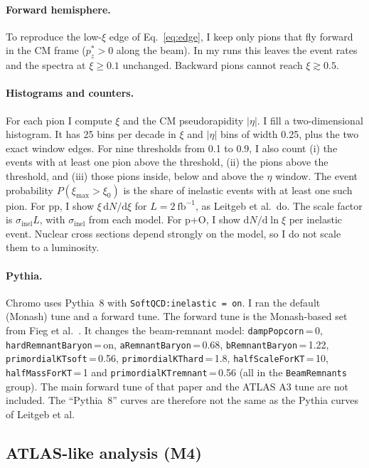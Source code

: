 \documentclass[11pt,a4paper]{article}
\newcommand{\dd}{\mathrm{d}}
\begin{document}
\paragraph{Forward hemisphere.}
To reproduce the low-$\xi$ edge of Eq.~\eqref{eq:edge}, I keep only pions that fly forward in the CM frame ($p_z^{*}>0$ along the beam).
In my runs this leaves the event rates and the spectra at $\xi\geq0.1$ unchanged.
Backward pions cannot reach $\xi\gtrsim0.5$.

\paragraph{Histograms and counters.}
For each pion I compute $\xi$ and the CM pseudorapidity $|\eta|$.
I fill a two-dimensional histogram.
It has 25 bins per decade in $\xi$ and $|\eta|$ bins of width 0.25, plus the two exact window edges.
For nine thresholds from 0.1 to 0.9, I also count
(i) the events with at least one pion above the threshold,
(ii) the pions above the threshold, and
(iii) those pions inside, below and above the $\eta$ window.
The event probability $P(\xi_{\max}>\xi_0)$ is the share of inelastic events with at least one such pion.
For pp, I show $\xi\,\dd N/\dd\xi$ for $L=2~\mathrm{fb^{-1}}$, as Leitgeb et al.\ do.
The scale factor is $\sigma_{\mathrm{inel}}L$, with $\sigma_{\mathrm{inel}}$ from each model.
For p+O, I show $\dd N/\dd\ln\xi$ per inelastic event.
Nuclear cross sections depend strongly on the model, so I do not scale them to a luminosity.

\paragraph{Pythia.}
Chromo uses Pythia~8 with \texttt{SoftQCD:inelastic = on}.
I ran the default (Monash) tune and a forward tune.
The forward tune is the Monash-based set from Fieg et al.\ \cite{Fieg:2024tune}.
It changes the beam-remnant model: \texttt{dampPopcorn}\,=\,0, \texttt{hardRemnantBaryon}\,=\,on, \texttt{aRemnantBaryon}\,=\,0.68, \texttt{bRemnantBaryon}\,=\,1.22, \texttt{primordialKTsoft}\,=\,0.56, \texttt{primordialKThard}\,=\,1.8, \texttt{halfScaleForKT}\,=\,10, \texttt{halfMassForKT}\,=\,1 and \texttt{primordialKTremnant}\,=\,0.56 (all in the \texttt{BeamRemnants} group).
The main forward tune of that paper and the ATLAS A3 tune \cite{ATLAS:A3} are not included.
The ``Pythia~8'' curves are therefore not the same as the Pythia curves of Leitgeb et al.

\subsection{ATLAS-like analysis (M4)}
\end{document}
